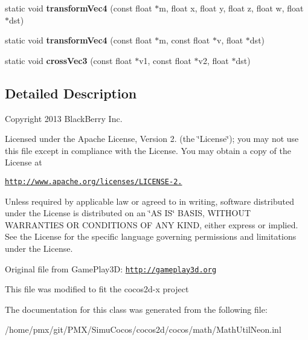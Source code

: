 \begin{DoxyCompactItemize}
\mbox{\label{classMathUtilNeon_aee855e6656996bc166d95442d75d46db}} 
static void {\bfseries transform\+Vec4} (const float $\ast$m, float x, float y, float z, float w, float $\ast$dst)
\item 
\mbox{\label{classMathUtilNeon_adff6aeb16ffd47bc03170fc72863d5fd}} 
static void {\bfseries transform\+Vec4} (const float $\ast$m, const float $\ast$v, float $\ast$dst)
\item 
\mbox{\label{classMathUtilNeon_ae817b495a619d5a67393ce45ba6debed}} 
static void {\bfseries cross\+Vec3} (const float $\ast$v1, const float $\ast$v2, float $\ast$dst)
\end{DoxyCompactItemize}


\subsection{Detailed Description}
Copyright 2013 Black\+Berry Inc.

Licensed under the Apache License, Version 2. (the \char`\"{}\+License\char`\"{}); you may not use this file except in compliance with the License. You may obtain a copy of the License at

\href{http://www.apache.org/licenses/LICENSE-2.0}{\tt http\+://www.\+apache.\+org/licenses/\+L\+I\+C\+E\+N\+S\+E-\/2.}

Unless required by applicable law or agreed to in writing, software distributed under the License is distributed on an \char`\"{}\+A\+S I\+S\char`\"{} B\+A\+S\+IS, W\+I\+T\+H\+O\+UT W\+A\+R\+R\+A\+N\+T\+I\+ES OR C\+O\+N\+D\+I\+T\+I\+O\+NS OF A\+NY K\+I\+ND, either express or implied. See the License for the specific language governing permissions and limitations under the License.

Original file from Game\+Play3D\+: \href{http://gameplay3d.org}{\tt http\+://gameplay3d.\+org}

This file was modified to fit the cocos2d-\/x project 

The documentation for this class was generated from the following file\+:\begin{DoxyCompactItemize}
\item 
/home/pmx/git/\+P\+M\+X/\+Simu\+Cocos/cocos2d/cocos/math/Math\+Util\+Neon.\+inl\end{DoxyCompactItemize}
